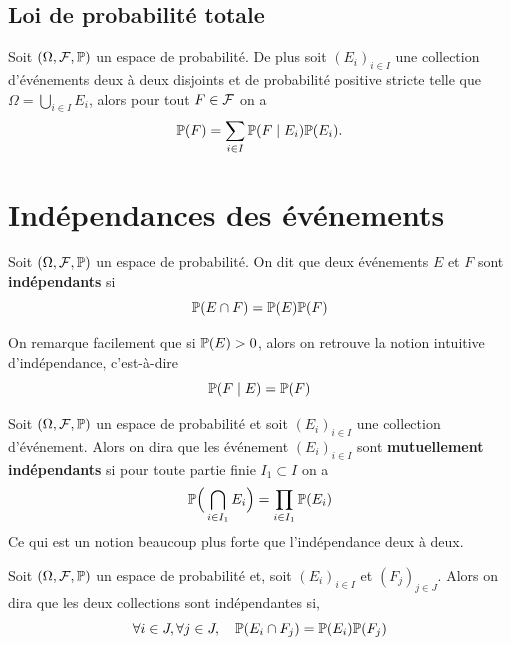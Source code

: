 \subsection{Loi de probabilité totale}

\begin{proposition}
	Soit $(\Omega, \F, \P)$ un espace de probabilité. De plus soit $(E_i)_{i \in I}$ une collection d'événements deux à deux disjoints et de probabilité positive stricte telle que $\Omega = \bigcup_{i \in I} E_i$, alors pour tout $F \in \F$ on a
	\[
	\P(F) = \sum_{i \in I} \P(F \mid E_i) \P(E_i).
	\]
\end{proposition}


\section{Indépendances des événements}
\begin{definition}
	Soit $(\Omega, \F, \P)$ un espace de probabilité. On dit que deux événements $E$ et $F$ sont \textbf{indépendants} si
	\[
	\P(E \cap F) = \P(E) \P(F)
	\]
\end{definition}

\begin{remarque}
	On remarque facilement que si $\P(E) > 0$, alors on retrouve la notion intuitive d'indépendance, c'est-à-dire
	\[
	\P(F \mid E) = \P(F)
	\]
\end{remarque}

\begin{definition}
	Soit $(\Omega, \F, \P)$ un espace de probabilité et soit $(E_i)_{i \in I}$ une collection d'événement. Alors on dira que les événement $(E_i)_{i \in I}$ sont \textbf{mutuellement indépendants} si pour toute partie finie $I_1 \subset I$ on a
	\[
	\P\Big( \bigcap_{i \in I_1} E_i\Big) = \prod_{i \in I_1} \P(E_i)
	\]
	Ce qui est un notion beaucoup plus forte que l'indépendance deux à deux.
\end{definition}

\begin{definition}
	Soit $(\Omega, \F, \P)$ un espace de probabilité et, soit $(E_i)_{i \in I}$ et $(F_j)_{j \in J}$. Alors on dira que les deux collections sont indépendantes si,
	\[
	\forall i \in J, \forall j \in J, \quad \P(E_i \cap F_j) = \P(E_i) \P(F_j)
	\]
\end{definition}


